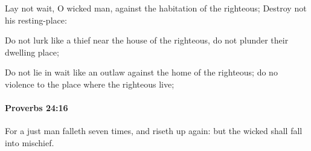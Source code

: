 			\begin{versebox}
					\item[BHS] 
					\item[ASV] Lay not wait, O wicked man, against the habitation of the righteous; Destroy not his resting-place:
					\item[NIV] Do not lurk like a thief near the house of the righteous, do not plunder their dwelling place;
					\item[NRSV] Do not lie in wait like an outlaw against the home of the righteous; do no violence to the place where the righteous live;
			\end{versebox}

		\paragraph{Proverbs 24:16} %
			\label{PROVERBS-24-16}

			For a just man falleth seven times, and riseth up again: but the wicked shall fall into mischief.

